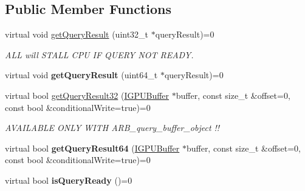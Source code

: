 \subsection*{Public Member Functions}
\begin{DoxyCompactItemize}
\item 
virtual void \hyperlink{classirr_1_1video_1_1IQueryObject_a43774e2f4777db9fd8d9761ad1c66928}{get\+Query\+Result} (uint32\+\_\+t $\ast$query\+Result)=0\hypertarget{classirr_1_1video_1_1IQueryObject_a43774e2f4777db9fd8d9761ad1c66928}{}\label{classirr_1_1video_1_1IQueryObject_a43774e2f4777db9fd8d9761ad1c66928}

\begin{DoxyCompactList}\small\item\em A\+LL will S\+T\+A\+LL C\+PU IF Q\+U\+E\+RY N\+OT R\+E\+A\+DY. \end{DoxyCompactList}\item 
virtual void {\bfseries get\+Query\+Result} (uint64\+\_\+t $\ast$query\+Result)=0\hypertarget{classirr_1_1video_1_1IQueryObject_aa25da93912517d5579b2c99e12611219}{}\label{classirr_1_1video_1_1IQueryObject_aa25da93912517d5579b2c99e12611219}

\item 
virtual bool \hyperlink{classirr_1_1video_1_1IQueryObject_aecb33e043550f7114734f8a854300391}{get\+Query\+Result32} (\hyperlink{classirr_1_1video_1_1IGPUBuffer}{I\+G\+P\+U\+Buffer} $\ast$buffer, const size\+\_\+t \&offset=0, const bool \&conditional\+Write=true)=0\hypertarget{classirr_1_1video_1_1IQueryObject_aecb33e043550f7114734f8a854300391}{}\label{classirr_1_1video_1_1IQueryObject_aecb33e043550f7114734f8a854300391}

\begin{DoxyCompactList}\small\item\em A\+V\+A\+I\+L\+A\+B\+LE O\+N\+LY W\+I\+TH A\+R\+B\+\_\+query\+\_\+buffer\+\_\+object !! \end{DoxyCompactList}\item 
virtual bool {\bfseries get\+Query\+Result64} (\hyperlink{classirr_1_1video_1_1IGPUBuffer}{I\+G\+P\+U\+Buffer} $\ast$buffer, const size\+\_\+t \&offset=0, const bool \&conditional\+Write=true)=0\hypertarget{classirr_1_1video_1_1IQueryObject_a0e02e85a0861e96f6c59eae693c9127f}{}\label{classirr_1_1video_1_1IQueryObject_a0e02e85a0861e96f6c59eae693c9127f}

\item 
virtual bool {\bfseries is\+Query\+Ready} ()=0\hypertarget{classirr_1_1video_1_1IQueryObject_ae7a325b0492adb930d028c63bba02922}{}\label{classirr_1_1video_1_1IQueryObject_ae7a325b0492adb930d028c63bba02922}


\end{DoxyCompactItemize}
